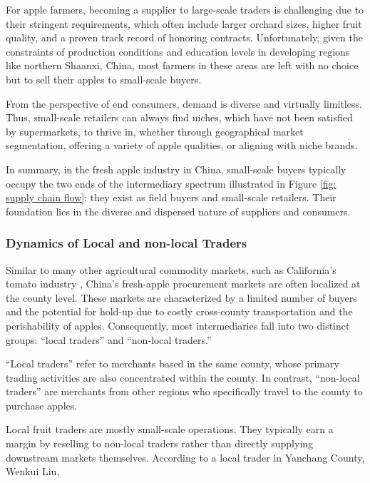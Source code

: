 For apple farmers, becoming a supplier to large-scale traders is challenging due to their stringent requirements, which often include larger orchard sizes, higher fruit quality, and a proven track record of honoring contracts. Unfortunately, given the constraints of production conditions and education levels in developing regions like northern Shaanxi, China, most farmers in these areas are left with no choice but to sell their apples to small-scale buyers.

From the perspective of end consumers, demand is diverse and virtually limitless. Thus, small-scale retailers can always find niches, which have not been satisfied by supermarkets, to thrive in, whether through geographical market segmentation, offering a variety of apple qualities, or aligning with niche brands.

In summary, in the fresh apple industry in China, small-scale buyers typically occupy the two ends of the intermediary spectrum illustrated in Figure \ref{fig: supply chain flow}: they exist as field buyers and small-scale retailers. Their foundation lies in the diverse and dispersed nature of suppliers and consumers.




\subsubsection{Dynamics of Local and non-local Traders \label{Section: intro of Local and non-local traders}}
\noindent Similar to many other agricultural commodity markets, such as California's tomato industry \citep{hamilton2024spatial}, China's fresh-apple procurement markets are often localized at the county level. These markets are characterized by a limited number of buyers and the potential for hold-up due to costly cross-county transportation and the perishability of apples. Consequently, most intermediaries fall into two distinct groups: ``local traders'' and ``non-local traders.''  

``Local traders'' refer to merchants based in the same county, whose primary trading activities are also concentrated within the county. In contrast, ``non-local traders'' are merchants from other regions who specifically travel to the county to purchase apples.  

Local fruit traders are mostly small-scale operations. They typically earn a margin by reselling to non-local traders rather than directly supplying downstream markets themselves. According to a local trader in Yanchang County, Wenkui Liu, 

